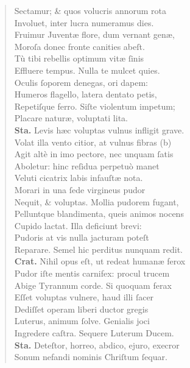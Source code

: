 \documentclass[a4paper,12pt]{article}
\begin{document}
\begin{verse}
Sectamur; \& quos volucris annorum rota\\[0pt]
Involuet, inter lucra numeramus dies.\\[0pt]
Fruimur Juventæ flore, dum vernant genæ,\\[0pt]
Moroſa donec fronte canities abeſt.\\[0pt]
Tù tibi rebellis optimum vitæ ſinis\\[0pt]
Effluere tempus. Nulla te mulcet quies.\\[0pt]
Oculis ſoporem denegas, ori dapem:\\[0pt]
Humeros flagello, latera dentato petis,\\[0pt]
Repetiſque ferro. Siſte violentum impetum;\\[0pt]
Placare naturæ, voluptati lita.\\[0pt]
\textbf{Sta.} Levis hæc voluptas vulnus infligit grave.\\[0pt]
Volat illa vento citior, at vulnus fibras (b)\footnotemark\\[0pt]
Agit altè in imo pectore, nec unquam ſatis\\[0pt]
Aboletur: hinc reſidua perpetuò manet\\[0pt]
Veluti cicatrix labis infauſtæ nota.\\[0pt]
Morari in una ſede virgineus pudor\\[0pt]
Nequit, \& voluptas. Mollia pudorem fugant,\\[0pt]
Pelluntque blandimenta, queis animos nocens\\[0pt]
Cupido lactat. Illa deficiunt brevi:\\[0pt]
Pudoris at vis nulla jacturam poteſt\\[0pt]
Reparare. Semel hic perditus nunquam redit.\\[0pt]
\textbf{Crat.} Nihil opus eſt, ut redeat humanæ ferox\\[0pt]
Pudor iſte mentis carnifex: procul trucem\\[0pt]
Abige Tyrannum corde. Si quoquam ferax\\[0pt]
Eſſet voluptas vulnere, haud illi ſacer\\[0pt]
Dediſſet operam liberi ductor gregis\\[0pt]
Luterus, animum ſolve. Genialis joci\\[0pt]
Ingredere caſtra. Sequere Luterum Ducem.\\[0pt]
\textbf{Sta.} Deteſtor, horreo, abdico, ejuro, execror\\[0pt]
Sonum nefandi nominis Chriſtum ſequar.\\[0pt]

\end{verse}
\end{document}
